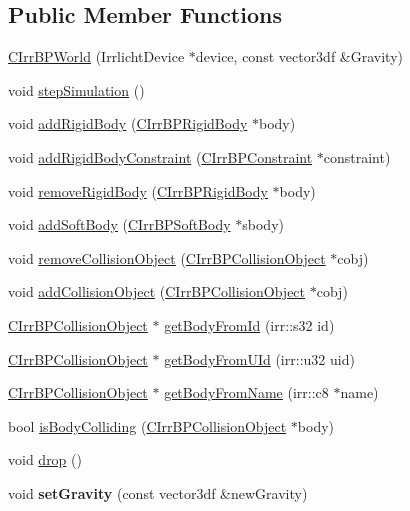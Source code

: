 \subsection*{Public Member Functions}
\begin{DoxyCompactItemize}
\item 
\hyperlink{class_c_irr_b_p_world_a585d92e41db74a19bf1cb982ddc0cddc}{CIrrBPWorld} (IrrlichtDevice $\ast$device, const vector3df \&Gravity)
\item 
void \hyperlink{class_c_irr_b_p_world_aa676e88466f927af2ac0c4c8cd94e0f3}{stepSimulation} ()
\item 
void \hyperlink{class_c_irr_b_p_world_aed7c6f5d1240e3b1b27ba880d3b31d77}{addRigidBody} (\hyperlink{class_c_irr_b_p_rigid_body}{CIrrBPRigidBody} $\ast$body)
\item 
void \hyperlink{class_c_irr_b_p_world_a7565f787e92f3c3cf76da072fe175b11}{addRigidBodyConstraint} (\hyperlink{class_c_irr_b_p_constraint}{CIrrBPConstraint} $\ast$constraint)
\item 
void \hyperlink{class_c_irr_b_p_world_a7133c6b9763ac425ac579cdfbda8788b}{removeRigidBody} (\hyperlink{class_c_irr_b_p_rigid_body}{CIrrBPRigidBody} $\ast$body)
\item 
void \hyperlink{class_c_irr_b_p_world_aa0f65ab61bfef47d9e0792141ebc8e35}{addSoftBody} (\hyperlink{class_c_irr_b_p_soft_body}{CIrrBPSoftBody} $\ast$sbody)
\item 
void \hyperlink{class_c_irr_b_p_world_ab5e0297133d23d91f2400148072df1b9}{removeCollisionObject} (\hyperlink{class_c_irr_b_p_collision_object}{CIrrBPCollisionObject} $\ast$cobj)
\item 
void \hyperlink{class_c_irr_b_p_world_a566ce1f1107d563cec07c2406946bb2c}{addCollisionObject} (\hyperlink{class_c_irr_b_p_collision_object}{CIrrBPCollisionObject} $\ast$cobj)
\item 
\hyperlink{class_c_irr_b_p_collision_object}{CIrrBPCollisionObject} $\ast$ \hyperlink{class_c_irr_b_p_world_a93b02dcd8f10ea9c75760c24a4a1f9ad}{getBodyFromId} (irr::s32 id)
\item 
\hyperlink{class_c_irr_b_p_collision_object}{CIrrBPCollisionObject} $\ast$ \hyperlink{class_c_irr_b_p_world_a814c63b0e2c83baa9566a35b1c043b9d}{getBodyFromUId} (irr::u32 uid)
\item 
\hyperlink{class_c_irr_b_p_collision_object}{CIrrBPCollisionObject} $\ast$ \hyperlink{class_c_irr_b_p_world_a0fcfac8b63cd5c886a763503b85c5f63}{getBodyFromName} (irr::c8 $\ast$name)
\item 
bool \hyperlink{class_c_irr_b_p_world_a9938308730b814fdd43d2413af29f4d7}{isBodyColliding} (\hyperlink{class_c_irr_b_p_collision_object}{CIrrBPCollisionObject} $\ast$body)
\item 
void \hyperlink{class_c_irr_b_p_world_a7cd82f40cde955cb54c1fc0268691be6}{drop} ()
\item 
\hypertarget{class_c_irr_b_p_world_a96e06a9d2b64d474bfd5325d2ffe809e}{
void {\bfseries setGravity} (const vector3df \&newGravity)}
\label{class_c_irr_b_p_world_a96e06a9d2b64d474bfd5325d2ffe809e}


\end{DoxyCompactItemize}
